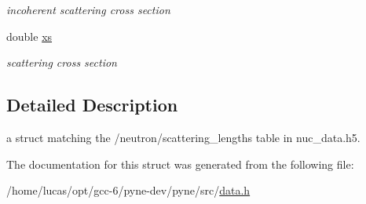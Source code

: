 \begin{DoxyCompactItemize}
\begin{DoxyCompactList}\small\item\em incoherent scattering cross section \end{DoxyCompactList}\item 
double \hyperlink{structpyne_1_1scattering__lengths_aaaab6ef13d13f4058b263f0d28da9ac3}{xs}\hypertarget{structpyne_1_1scattering__lengths_aaaab6ef13d13f4058b263f0d28da9ac3}{}\label{structpyne_1_1scattering__lengths_aaaab6ef13d13f4058b263f0d28da9ac3}

\begin{DoxyCompactList}\small\item\em scattering cross section \end{DoxyCompactList}\end{DoxyCompactItemize}


\subsection{Detailed Description}
a struct matching the \textquotesingle{}/neutron/scattering\+\_\+lengths\textquotesingle{} table in nuc\+\_\+data.\+h5. 

The documentation for this struct was generated from the following file\+:\begin{DoxyCompactItemize}
\item 
/home/lucas/opt/gcc-\/6/pyne-\/dev/pyne/src/\hyperlink{data_8h}{data.\+h}\end{DoxyCompactItemize}
